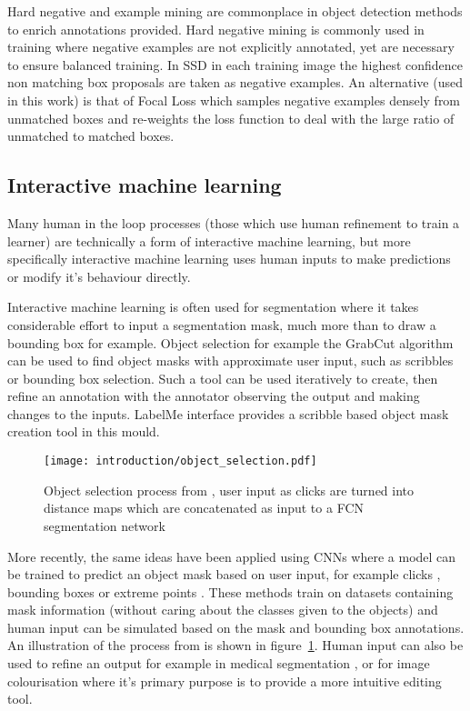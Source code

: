 Hard negative and example mining are commonplace in object detection methods to enrich annotations provided. Hard negative mining is commonly used in training where negative examples are not explicitly annotated, yet are necessary to ensure balanced training. In \gls{SSD} \cite{Liu2016a} in each training image the highest confidence non matching  box proposals are taken as negative examples. An alternative (used in this work) is that of Focal Loss \cite{Lin2017} which samples negative examples densely from unmatched boxes and re-weights the loss function to deal with the large ratio of unmatched to matched boxes.


\subsection{Interactive machine learning}

Many human in the loop processes (those which use human refinement to train a learner) are technically a form of interactive machine learning, but more specifically interactive machine learning uses human inputs to make predictions or modify it's behaviour directly.

Interactive machine learning is often used for segmentation where it takes considerable effort to input a segmentation mask, much more than to draw a bounding box for example. Object selection for example the GrabCut algorithm \cite{Rother} can be used to find object masks with approximate user input, such as scribbles or bounding box selection. Such a tool can be used iteratively to create, then refine an annotation with the annotator observing the output and making changes to the inputs.  LabelMe \cite{Russell2007} interface provides a scribble based object mask creation tool in this mould. 

\begin{figure}[h]
  \centering
  \texttt{[image: introduction/object\_selection.pdf]}
  \caption{Object selection process from \cite{Xu2016b}, user input as clicks are turned into distance maps which are concatenated as input to a \gls{FCN} segmentation network}  
  \label{fig:object_selection}
\end{figure}

More recently, the same ideas have been applied using \gls{CNN}s where a model can be trained to predict an object mask based on user input, for example clicks \cite{Xu2016b, Boroujerdi2017}, bounding boxes \cite {Xu2017} or extreme points \cite{Maninis2017}. These methods train on datasets containing mask information (without caring about the classes given to the objects) and human input can be simulated based on the mask and bounding box annotations. An illustration of the process from \cite{Xu2016b} is shown in figure~\ref{fig:object_selection}. Human input can also be used to refine an output for example in medical segmentation \cite{Wang2017}, or for image colourisation \cite{Zhang} where it's primary purpose is to provide a more intuitive editing tool.

